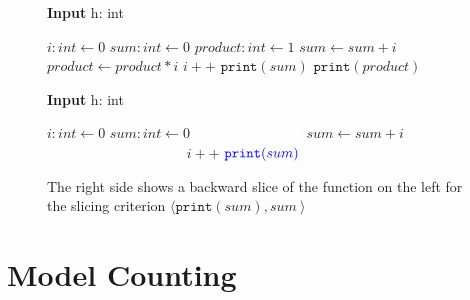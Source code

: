 \begin{figure}
    \centering
    \begin{minipage}{.4\textwidth}
        \begin{algorithm}[H]
            \hspace*{\algorithmicindent} \textbf{Input} h: int \\
            \hspace*{1em}
            \begin{algorithmic}
                \State $i: int \leftarrow 0$
                \State $sum: int \leftarrow 0$
                \State $product: int \leftarrow 1$
                    \State $sum \leftarrow sum + i$
                    \State $product \leftarrow product * i$
                    \State $i++$
                \EndWhile
                \State $\mathtt{print}(sum)$
                \State $\mathtt{print}(product)$
            \end{algorithmic}
        \end{algorithm}
    \end{minipage}
    \hfill
    \begin{minipage}{.4\textwidth}
        \begin{algorithm}[H]
            \hspace*{\algorithmicindent} \textbf{Input} h: int \\
            \hspace*{1em}
            \begin{algorithmic}
                \State $i: int \leftarrow 0$
                \State $sum: int \leftarrow 0$
                \State $\color{white} product: int \leftarrow 1$
                    \State $sum \leftarrow sum + i$
                    \State $\color{white} product \leftarrow product * i$
                    \State $i++$
                \EndWhile
                \State $\color{blue} \mathtt{print}(sum)$
                \State $\color{white} \mathtt{print}(product)$
            \end{algorithmic}
        \end{algorithm}
    \end{minipage}
    \caption{The right side shows a backward slice of the function on the left for the slicing criterion $\langle \mathtt{print}(sum), sum \: \rangle$}
    \label{fig:slice}
\end{figure}


\section{Model Counting}

